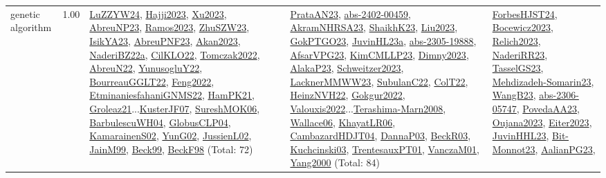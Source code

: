 {\begin{longtable}{p{3cm}r>{\raggedright\arraybackslash}p{6cm}>{\raggedright\arraybackslash}p{6cm}>{\raggedright\arraybackslash}p{8cm}}
\index{genetic algorithm}\index{Algorithms!genetic algorithm}genetic algorithm &  1.00 & \hyperref[detail:LuZZYW24]{LuZZYW24}, \hyperref[detail:Hajji2023]{Hajji2023}, \hyperref[detail:Xu2023]{Xu2023}, \hyperref[detail:AbreuNP23]{AbreuNP23}, \hyperref[detail:Ramos2023]{Ramos2023}, \hyperref[detail:ZhuSZW23]{ZhuSZW23}, \hyperref[detail:IsikYA23]{IsikYA23}, \hyperref[detail:AbreuPNF23]{AbreuPNF23}, \hyperref[detail:Akan2023]{Akan2023}, \hyperref[detail:NaderiBZ22a]{NaderiBZ22a}, \hyperref[detail:CilKLO22]{CilKLO22}, \hyperref[detail:Tomczak2022]{Tomczak2022}, \hyperref[detail:AbreuN22]{AbreuN22}, \hyperref[detail:YunusogluY22]{YunusogluY22}, \hyperref[detail:BourreauGGLT22]{BourreauGGLT22}, \hyperref[detail:Feng2022]{Feng2022}, \hyperref[detail:EtminaniesfahaniGNMS22]{EtminaniesfahaniGNMS22}, \hyperref[detail:HamPK21]{HamPK21}, \hyperref[detail:Groleaz21]{Groleaz21}...\hyperref[detail:KusterJF07]{KusterJF07}, \hyperref[detail:SureshMOK06]{SureshMOK06}, \hyperref[detail:BarbulescuWH04]{BarbulescuWH04}, \hyperref[detail:GlobusCLP04]{GlobusCLP04}, \hyperref[detail:KamarainenS02]{KamarainenS02}, \hyperref[detail:YunG02]{YunG02}, \hyperref[detail:JussienL02]{JussienL02}, \hyperref[detail:JainM99]{JainM99}, \hyperref[detail:Beck99]{Beck99}, \hyperref[detail:BeckF98]{BeckF98} (Total: 72) & \hyperref[detail:PrataAN23]{PrataAN23}, \hyperref[detail:abs-2402-00459]{abs-2402-00459}, \hyperref[detail:AkramNHRSA23]{AkramNHRSA23}, \hyperref[detail:ShaikhK23]{ShaikhK23}, \hyperref[detail:Liu2023]{Liu2023}, \hyperref[detail:GokPTGO23]{GokPTGO23}, \hyperref[detail:JuvinHL23a]{JuvinHL23a}, \hyperref[detail:abs-2305-19888]{abs-2305-19888}, \hyperref[detail:AfsarVPG23]{AfsarVPG23}, \hyperref[detail:KimCMLLP23]{KimCMLLP23}, \hyperref[detail:Dimny2023]{Dimny2023}, \hyperref[detail:AlakaP23]{AlakaP23}, \hyperref[detail:Schweitzer2023]{Schweitzer2023}, \hyperref[detail:LacknerMMWW23]{LacknerMMWW23}, \hyperref[detail:SubulanC22]{SubulanC22}, \hyperref[detail:ColT22]{ColT22}, \hyperref[detail:HeinzNVH22]{HeinzNVH22}, \hyperref[detail:Gokgur2022]{Gokgur2022}, \hyperref[detail:Valouxis2022]{Valouxis2022}...\hyperref[detail:Terashima-Marn2008]{Terashima-Marn2008}, \hyperref[detail:Wallace06]{Wallace06}, \hyperref[detail:KhayatLR06]{KhayatLR06}, \hyperref[detail:CambazardHDJT04]{CambazardHDJT04}, \hyperref[detail:DannaP03]{DannaP03}, \hyperref[detail:BeckR03]{BeckR03}, \hyperref[detail:Kuchcinski03]{Kuchcinski03}, \hyperref[detail:TrentesauxPT01]{TrentesauxPT01}, \hyperref[detail:VanczaM01]{VanczaM01}, \hyperref[detail:Yang2000]{Yang2000} (Total: 84) & \hyperref[detail:ForbesHJST24]{ForbesHJST24}, \hyperref[detail:Bocewicz2023]{Bocewicz2023}, \hyperref[detail:Relich2023]{Relich2023}, \hyperref[detail:NaderiRR23]{NaderiRR23}, \hyperref[detail:TasselGS23]{TasselGS23}, \hyperref[detail:Mehdizadeh-Somarin23]{Mehdizadeh-Somarin23}, \hyperref[detail:WangB23]{WangB23}, \hyperref[detail:abs-2306-05747]{abs-2306-05747}, \hyperref[detail:PovedaAA23]{PovedaAA23}, \hyperref[detail:Oujana2023]{Oujana2023}, \hyperref[detail:Eiter2023]{Eiter2023}, \hyperref[detail:JuvinHHL23]{JuvinHHL23}, \hyperref[detail:Bit-Monnot23]{Bit-Monnot23}, \hyperref[detail:AalianPG23]{AalianPG23}, 
\end{longtable}}

